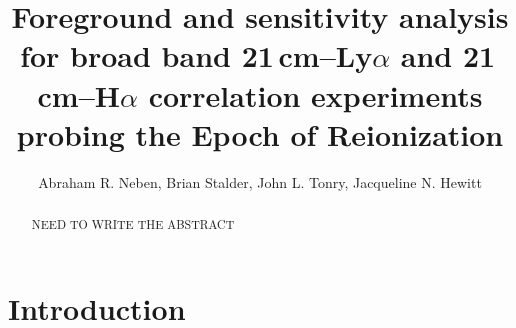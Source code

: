 \documentclass{emulateapj}
\begin{document}
\title{Foreground and sensitivity analysis for broad band 21\,\MakeLowercase{cm}--L\MakeLowercase{y}$\alpha$ and 21\,\MakeLowercase{cm}--H$\alpha$ correlation experiments probing the Epoch of Reionization}


\author{Abraham R. Neben,
Brian Stalder,
John L. Tonry,
Jacqueline N. Hewitt}




\begin{abstract}
NEED TO WRITE THE ABSTRACT
\end{abstract}


\section{Introduction}
\end{document}
